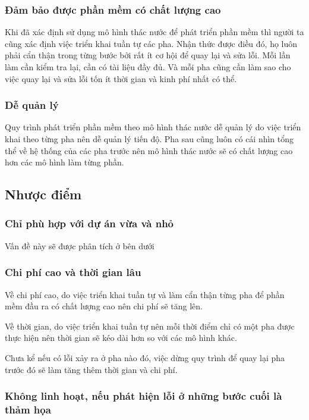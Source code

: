 \documentclass[14pt]{extarticle}
\begin{document}
\subsubsection*{Đảm bảo được phần mềm có chất lượng cao}
Khi đã xác định sử dụng mô hình thác nước để phát triển phần mềm
thì người ta cũng xác định việc triển khai tuần tự các pha. Nhận thức
được điều đó, họ luôn phải cẩn thận trong từng bước bởi rất ít cơ hội
để quay lại và sửa lỗi. Mỗi lần làm cần kiểm tra lại, cần có tài liệu
đầy đủ. Và mỗi pha cũng cần làm sao cho việc quay lại và sửa lỗi
tốn ít thời gian và kinh phí nhất có thể.\\

\subsubsection*{Dễ quản lý}
Quy trình phát triển phần mềm theo mô hình thác nước dễ quản lý do
việc triển khai theo từng pha nên dễ quản lý tiến độ. Pha sau cũng luôn
có cái nhìn tổng thể về hệ thống của các pha trước nên mô hình thác nước
sẽ có chất lượng cao hơn các mô hình làm từng phần.

\subsection{Nhược điểm}

\subsubsection*{Chỉ phù hợp với dự án vừa và nhỏ}
Vấn đề này sẽ được phân tích ở bên dưới

\subsubsection*{Chi phí cao và thời gian lâu}
Về chi phí cao, do việc triển khai tuần tự và làm cẩn thận từng pha
để phần mềm đầu ra có chất lượng cao nên chi phí sẽ tăng lên.


Về thời gian, do việc triển khai tuần tự nên mỗi thời điểm chỉ có một
pha được thực hiện nên thời gian sẽ kéo dài hơn so với các mô hình khác.

Chưa kể nếu có lỗi xảy ra ở pha nào đó, việc dừng quy trình để quay lại
pha trước đó sẽ làm tăng thêm thời gian và chi phí.

\subsubsection*{Không linh hoạt, nếu phát hiện lỗi ở những bước cuối là thảm họa}
\end{document}
